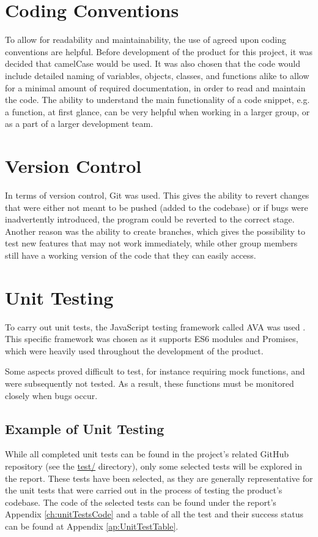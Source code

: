 \section{Coding Conventions}

To allow for readability and maintainability, the use of agreed upon coding conventions are helpful. Before development of the product for this project, it was decided that camelCase would be used. It was also chosen that the code would include detailed naming of variables, objects, classes, and functions alike to allow for a minimal amount of required documentation, in order to read and maintain the code. The ability to understand the main functionality of a code snippet, e.g. a function, at first glance, can be very helpful when working in a larger group, or as a part of a larger development team. 

\section{Version Control}
In terms of version control, Git was used. This gives the ability to revert changes that were either not meant to be pushed (added to the codebase) or if bugs were inadvertently introduced, the program could be reverted to the correct stage. Another reason was the ability to create branches, which gives the possibility to test new features that may not work immediately, while other group members still have a working version of the code that they can easily access.

\section{Unit Testing}
To carry out unit tests, the JavaScript testing framework called AVA was used \cite{AvaSource}. This specific framework was chosen as it supports ES6 modules and Promises, which were heavily used throughout the development of the product.

Some aspects proved difficult to test, for instance requiring mock functions, and were subsequently not tested. As a result, these functions must be monitored closely when bugs occur.

\subsection{Example of Unit Testing}
While all completed unit tests can be found in the project's related GitHub repository (see the \href{https://github.com/VinceAAU/P2/tree/main/test}{test/} directory), only some selected tests will be explored in the report. These tests have been selected, as they are generally representative for the unit tests that were carried out in the process of testing the product's codebase. The code of the selected tests can be found under the report's Appendix \ref{ch:unitTestsCode} and a table of all the test and their success status can be found at Appendix \ref{ap:UnitTestTable}.

